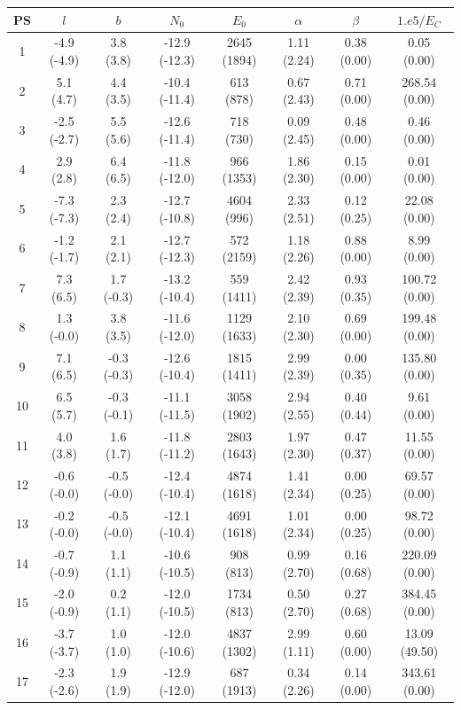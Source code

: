 \documentclass{article}
\begin{document}
\begin{table}[hbt]
\centering
\begin{tabular}{|c|c|c|c|c|c|c|c|}
\hline
PS & $l$ & $b$ & $N_0$ & $E_0$ & $\alpha$ & $\beta$ & $1.e5/E_C$ \\
\hline
1 & -4.9 (-4.9) & 3.8 (3.8) & -12.9 (-12.3) & 2645 (1894) & 1.11 (2.24) & 0.38 (0.00) & 0.05 (0.00) \\
2 & 5.1 (4.7) & 4.4 (3.5) & -10.4 (-11.4) & 613 (878) & 0.67 (2.43) & 0.71 (0.00) & 268.54 (0.00) \\
3 & -2.5 (-2.7) & 5.5 (5.6) & -12.6 (-11.4) & 718 (730) & 0.09 (2.45) & 0.48 (0.00) & 0.46 (0.00) \\
4 & 2.9 (2.8) & 6.4 (6.5) & -11.8 (-12.0) & 966 (1353) & 1.86 (2.30) & 0.15 (0.00) & 0.01 (0.00) \\
5 & -7.3 (-7.3) & 2.3 (2.4) & -12.7 (-10.8) & 4604 (996) & 2.33 (2.51) & 0.12 (0.25) & 22.08 (0.00) \\
6 & -1.2 (-1.7) & 2.1 (2.1) & -12.7 (-12.3) & 572 (2159) & 1.18 (2.26) & 0.88 (0.00) & 8.99 (0.00) \\
7 & 7.3 (6.5) & 1.7 (-0.3) & -13.2 (-10.4) & 559 (1411) & 2.42 (2.39) & 0.93 (0.35) & 100.72 (0.00) \\
8 & 1.3 (-0.0) & 3.8 (3.5) & -11.6 (-12.0) & 1129 (1633) & 2.10 (2.30) & 0.69 (0.00) & 199.48 (0.00) \\
9 & 7.1 (6.5) & -0.3 (-0.3) & -12.6 (-10.4) & 1815 (1411) & 2.99 (2.39) & 0.00 (0.35) & 135.80 (0.00) \\
10 & 6.5 (5.7) & -0.3 (-0.1) & -11.1 (-11.5) & 3058 (1902) & 2.94 (2.55) & 0.40 (0.44) & 9.61 (0.00) \\
11 & 4.0 (3.8) & 1.6 (1.7) & -11.8 (-11.2) & 2803 (1643) & 1.97 (2.30) & 0.47 (0.37) & 11.55 (0.00) \\
12 & -0.6 (-0.0) & -0.5 (-0.0) & -12.4 (-10.4) & 4874 (1618) & 1.41 (2.34) & 0.00 (0.25) & 69.57 (0.00) \\
13 & -0.2 (-0.0) & -0.5 (-0.0) & -12.1 (-10.4) & 4691 (1618) & 1.01 (2.34) & 0.00 (0.25) & 98.72 (0.00) \\
14 & -0.7 (-0.9) & 1.1 (1.1) & -10.6 (-10.5) & 908 (813) & 0.99 (2.70) & 0.16 (0.68) & 220.09 (0.00) \\
15 & -2.0 (-0.9) & 0.2 (1.1) & -12.0 (-10.5) & 1734 (813) & 0.50 (2.70) & 0.27 (0.68) & 384.45 (0.00) \\
16 & -3.7 (-3.7) & 1.0 (1.0) & -12.0 (-10.6) & 4837 (1302) & 2.99 (1.11) & 0.60 (0.00) & 13.09 (49.50) \\
17 & -2.3 (-2.6) & 1.9 (1.9) & -12.9 (-12.0) & 687 (1913) & 0.34 (2.26) & 0.14 (0.00) & 343.61 (0.00) \\

\end{tabular}
\end{table}
\end{document}
